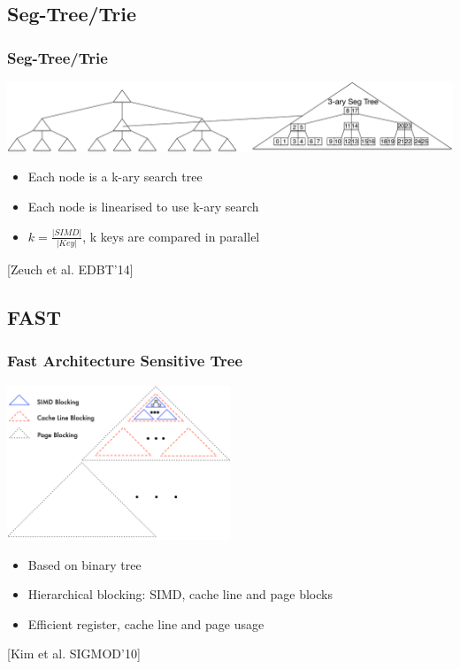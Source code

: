 \documentclass{beamer}
\begin{document}
\subsection{Seg-Tree/Trie}
\begin{frame}
	\frametitle{Seg-Tree/Trie}
	\begin{center}
		\includegraphics[width=1.0\textwidth]{img/SegTree.pdf}
	\end{center}
	\begin{itemize}
		\item Each node is a k-ary search tree
		\item Each node is linearised to use k-ary search
		\item $k = \frac{\vert SIMD \vert }{\vert Key \vert}$, k keys are compared in parallel
	\end{itemize}
	\vspace*{\fill}
	\begin{center}
		\tiny [Zeuch et al. EDBT’14]
	\end{center}
\end{frame}

\subsection{FAST}
\begin{frame}
	\frametitle{Fast Architecture Sensitive Tree}
	\begin{center}
		\includegraphics[width=0.5\textwidth]{img/fast.pdf}
	\end{center}
	\begin{itemize}
		\item Based on binary tree
		\item Hierarchical blocking: SIMD, cache line and page blocks
		\item Efficient register, cache line and page usage
	\end{itemize}
	\begin{center}
		\tiny [Kim et al. SIGMOD’10]
	\end{center}
\end{frame}
\end{document}
